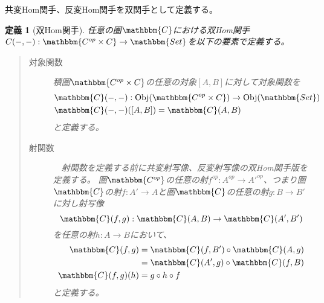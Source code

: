 \documentclass[dvipdfmx]{jsarticle}
\newcommand{\cat}[1]{\mathbbm{#1}}
\newcommand{\arrow}{\rightarrow}
\newcommand{\functor}[3]{#1:\cat{#2}\arrow \cat{#3}}
\newcommand{\obj}[1]{\mathrm{Obj}(\cat{#1})}
\newcommand{\mor}[3]{#1:#2\arrow #3}
\newcommand{\arset}[3]{\cat{#1}(#2,#3)}
\newtheorem{define}{定義}[section]
\numberwithin{proof}{subsection}
\numberwithin{prop}{subsection}
\numberwithin{define}{subsection}
\begin{document}
	共変Hom関手、反変Hom関手を双関手として定義する。
	\begin{define}[双Hom関手]
		任意の圏$\cat{C}$における双Hom関手$\functor{C(-,-)}{C^{op}\times C}{Set}$を以下の要素で定義する。
		\begin{quote}
			\begin{description}
				\item[対象関数] 積圏$\cat{C^{op}\times C}$の任意の対象$[A,B]$に対して対象関数を
				\begin{align*}
					&\mor{\arset{C}{-}{-}}{\obj{C^{op}\times C}}{\obj{Set}}\\
					&\arset{C}{-}{-}([A,B])=\arset{C}{A}{B}
				\end{align*}
				と定義する。
				\item[射関数]　射関数を定義する前に共変射写像、反変射写像の双Hom関手版を定義する。
				圏$\cat{C^{op}}$の任意の射$\mor{f^{op}}{A^{op}}{A'^{op}}$、つまり圏$\cat{C}$の射$\mor{f}{A'}{A}$と圏$\cat{C}$の任意の射$\mor{g}{B}{B'}$に対し射写像\[\mor{\arset{C}{f}{g}}{\arset{C}{A}{B}}{\arset{C}{A'}{B'}}\]を任意の射$\mor{h}{A}{B}$において、
				\begin{align*}
					\arset{C}{f}{g}&=\arset{C}{f}{B'}\circ\arset{C}{A}{g}\\
					&=\arset{C}{A'}{g}\circ\arset{C}{f}{B}\\
					\arset{C}{f}{g}(h)&=g\circ h\circ f\\
				\end{align*}
				と定義する。

				\begin{center}
				\end{center}


\end{description}
\end{quote}
\end{define}
\end{document}
